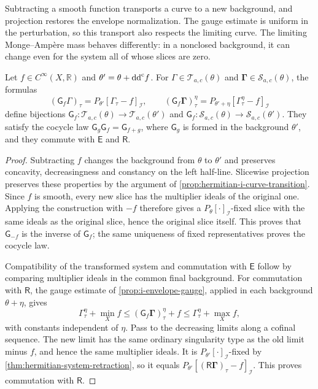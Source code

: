 Subtracting a smooth function transports a curve to a new background, and projection restores the envelope normalization. The gauge estimate is uniform in the perturbation, so this transport also respects the limiting curve. The limiting Monge--Amp\`ere mass behaves differently: in a nonclosed background, it can change even for the system all of whose slices are zero.

\begin{proposition}\label{prop:hermitian-system-gauge}
Let $f\in C^\infty(X,\mathbb R)$ and $\theta'=\theta+\mathrm{dd}^{\mathrm{c}} f$. For $\Gamma\in\mathscr T_{a,c}(\theta)$ and $\boldsymbol\Gamma\in\mathscr S_{a,c}(\theta)$, the formulas
\[
 (\mathsf G_f\Gamma)_\tau=P_{\theta'}[\Gamma_\tau-f]_{\mathcal I},
 \qquad
 (\mathsf G_f\boldsymbol\Gamma)^\eta_\tau
                    =P_{\theta'+\eta}[\Gamma^\eta_\tau-f]_{\mathcal I}
\]
define bijections $\mathsf G_f\colon\mathscr T_{a,c}(\theta)\to\mathscr T_{a,c}(\theta')$ and $\mathsf G_f\colon\mathscr S_{a,c}(\theta)\to\mathscr S_{a,c}(\theta')$. They satisfy the cocycle law $\mathsf G_g\mathsf G_f=\mathsf G_{f+g}$, where $\mathsf G_g$ is formed in the background $\theta'$, and they commute with $\mathsf E$ and $\mathsf R$.
\end{proposition}
\begin{proof}
Subtracting $f$ changes the background from $\theta$ to $\theta'$ and preserves concavity, decreasingness and constancy on the left half-line. Slicewise projection preserves these properties by the argument of \cref{prop:hermitian-i-curve-transition}. Since $f$ is smooth, every new slice has the multiplier ideals of the original one. Applying the construction with $-f$ therefore gives a $P_\theta[\cdot]_{\mathcal I}$-fixed slice with the same ideals as the original slice, hence the original slice itself. This proves that $\mathsf G_{-f}$ is the inverse of $\mathsf G_f$; the same uniqueness of fixed representatives proves the cocycle law.

Compatibility of the transformed system and commutation with $\mathsf E$ follow by comparing multiplier ideals in the common final background. For commutation with $\mathsf R$, the gauge estimate of \cref{prop:i-envelope-gauge}, applied in each background $\theta+\eta$, gives
\[
 \Gamma^\eta_\tau+\min_Xf
 \leq (\mathsf G_f\boldsymbol\Gamma)^\eta_\tau+f
 \leq\Gamma^\eta_\tau+\max_Xf,
\]
with constants independent of $\eta$. Pass to the decreasing limits along a cofinal sequence. The new limit has the same ordinary singularity type as the old limit minus $f$, and hence the same multiplier ideals. It is $P_{\theta'}[\cdot]_{\mathcal I}$-fixed by \cref{thm:hermitian-system-retraction}, so it equals $P_{\theta'}[(\mathsf R\boldsymbol\Gamma)_\tau-f]_{\mathcal I}$. This proves commutation with $\mathsf R$.
\end{proof}

